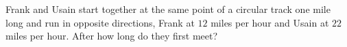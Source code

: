 Frank and Usain start together at the same point of a circular track one mile long and run in opposite directions, Frank at $12$ miles per hour and Usain at $22$ miles per hour. After how long do they first meet?
